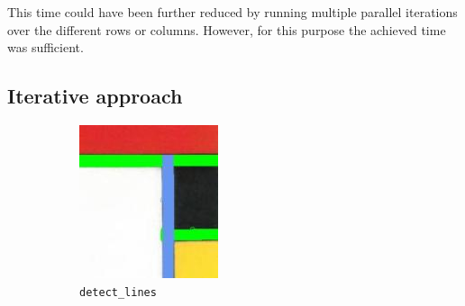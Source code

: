 \documentclass[serif,article,noparskip]{agse-thesis}
\begin{document}
This time could have been further reduced by running multiple parallel
iterations over the different rows or columns. However, for this purpose the
achieved time was sufficient.

\subsection{Iterative approach} \label{iterative}

\begin{figure}[b]
\centering
\begin{subfigure}{.23\textwidth}
  \includegraphics[width=\linewidth]{images/detect-1.jpg}
  \caption{\texttt{detect\_lines}}
  \label{fig:detect1}
\end{subfigure}%
\begin{subfigure}{.23\textwidth}
  \centering

\end{subfigure}
\end{figure}
\end{document}
